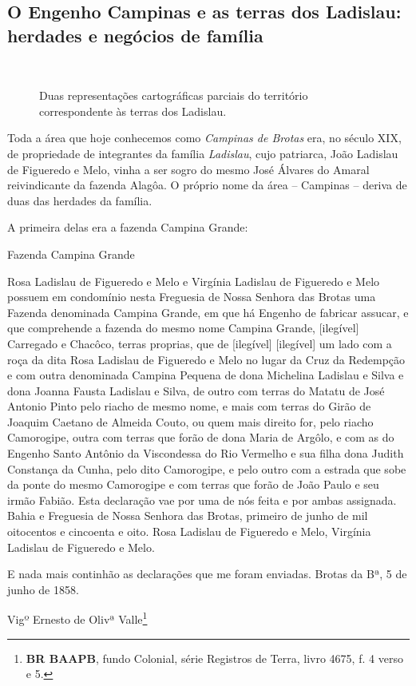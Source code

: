\subsection{O Engenho Campinas e as terras dos Ladislau: herdades e negócios de família}\label{subsec:campinasladislau}

\begin{figure}[!htp]
\centering
{}
\  %
\caption{Duas representações cartográficas parciais do território correspondente às terras dos Ladislau.}
\end{figure}

Toda a área que hoje conhecemos como \textit{Campinas de Brotas} era, no século XIX, de propriedade de integrantes da família \textit{Ladislau}, cujo patriarca, João Ladislau de Figueredo e Melo, vinha a ser sogro do mesmo José Álvares do Amaral reivindicante da fazenda Alagôa. O próprio nome da área -- Campinas -- deriva de duas das herdades da família.

A primeira delas era a fazenda Campina Grande:

\begin{citacao}
Fazenda Campina Grande

Rosa Ladislau de Figueredo e Melo e Virgínia Ladislau de Figueredo e Melo possuem em condomínio nesta Freguesia de Nossa Senhora das Brotas uma Fazenda denominada Campina Grande, em que há Engenho de fabricar assucar, e que comprehende a fazenda do mesmo nome Campina Grande, [ilegível] Carregado e Chacôco, terras proprias, que de [ilegível] [ilegível] um lado com a roça da dita Rosa Ladislau de Figueredo e Melo no lugar da Cruz da Redempção e com outra denominada Campina Pequena de dona Michelina Ladislau e Silva e dona Joanna Fausta Ladislau e Silva, de outro com terras do Matatu de José Antonio Pinto pelo riacho de mesmo nome, e mais com terras do Girão de Joaquim Caetano de Almeida Couto, ou quem mais direito for, pelo riacho Camorogipe, outra com terras que forão de dona Maria de Argôlo, e com as do Engenho Santo Antônio da Viscondessa do Rio Vermelho e sua filha dona Judith Constança da Cunha, pelo dito Camorogipe, e pelo outro com a estrada que sobe da ponte do mesmo Camorogipe e com terras que forão de João Paulo e seu irmão Fabião. Esta declaração vae por uma de nós feita e por ambas assignada. Bahia e Freguesia de Nossa Senhora das Brotas, primeiro de junho de mil oitocentos e cincoenta e oito. Rosa Ladislau de Figueredo e Melo, Virgínia Ladislau de Figueredo e Melo.

E nada mais continhão as declarações que me foram enviadas. Brotas da Bª, 5 de junho de 1858.

Vigº Ernesto de Olivª Valle\footnote{\textbf{BR BAAPB}, fundo Colonial, série Registros de Terra, livro 4675, f. 4 verso e 5.}
\end{citacao}

